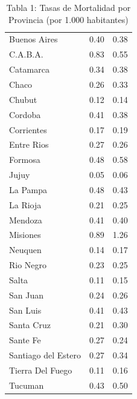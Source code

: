 \documentclass[
]{article}
\begin{document}
\begin{longtable}[l]{lll}
\caption{\label{tab:unnamed-chunk-6}Tabla 1: Tasas de Mortalidad por Provincia (por 1.000 habitantes)}\\
\toprule
\cellcolor{steelblue}{\textcolor{black}{Provincia}} & \cellcolor{steelblue}{\textcolor{black}{Tasa Cruda}} & \cellcolor{steelblue}{\textcolor{black}{Tasa Estandarizada}}\\
\midrule
Buenos Aires & 0.40 & 0.38\\
C.A.B.A. & 0.83 & 0.55\\
Catamarca & 0.34 & 0.38\\
Chaco & 0.26 & 0.33\\
Chubut & 0.12 & 0.14\\
\addlinespace
Cordoba & 0.41 & 0.38\\
Corrientes & 0.17 & 0.19\\
Entre Rios & 0.27 & 0.26\\
Formosa & 0.48 & 0.58\\
Jujuy & 0.05 & 0.06\\
\addlinespace
La Pampa & 0.48 & 0.43\\
La Rioja & 0.21 & 0.25\\
Mendoza & 0.41 & 0.40\\
Misiones & 0.89 & 1.26\\
Neuquen & 0.14 & 0.17\\
\addlinespace
Rio Negro & 0.23 & 0.25\\
Salta & 0.11 & 0.15\\
San Juan & 0.24 & 0.26\\
San Luis & 0.41 & 0.43\\
Santa Cruz & 0.21 & 0.30\\
\addlinespace
Sante Fe & 0.27 & 0.24\\
Santiago del Estero & 0.27 & 0.34\\
Tierra Del Fuego & 0.11 & 0.16\\
Tucuman & 0.43 & 0.50\\
\bottomrule
\end{longtable}
\end{document}
